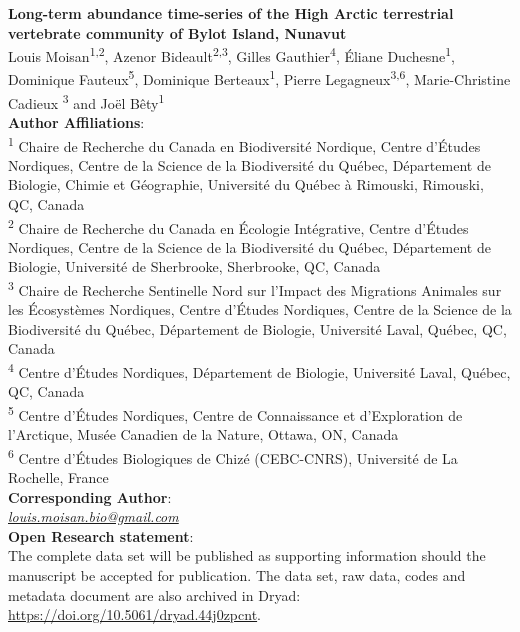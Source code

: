 \documentclass[a4paper,twoside,12pt]{article}
\begin{document}
 
\begingroup  
  \centering
\textbf{Long-term abundance time-series of the High Arctic terrestrial vertebrate community of Bylot Island, Nunavut}\\[1.5em]
 Louis Moisan\textsuperscript{1,2}, Azenor Bideault\textsuperscript{2,3}, Gilles Gauthier\textsuperscript{4}, Éliane Duchesne\textsuperscript{1}, 
 Dominique Fauteux\textsuperscript{5}, Dominique Berteaux\textsuperscript{1}, Pierre Legagneux\textsuperscript{3,6}, Marie-Christine Cadieux \textsuperscript{3} and Joël Bêty\textsuperscript{1}\\[1.5em]
\textbf{Author Affiliations}:\\
\textsuperscript{1} Chaire de Recherche du Canada en Biodiversité Nordique, Centre d’Études Nordiques, Centre de la Science de la Biodiversité du Québec, Département de Biologie, Chimie et Géographie, Université du Québec à Rimouski, Rimouski, QC, Canada\\
\textsuperscript{2} Chaire de Recherche du Canada en Écologie Intégrative, Centre d’Études Nordiques, Centre de la Science de la Biodiversité du Québec, Département de Biologie, Université de Sherbrooke, Sherbrooke, QC, Canada\\
\textsuperscript{3} Chaire de Recherche Sentinelle Nord sur l’Impact des Migrations Animales sur les Écosystèmes Nordiques, Centre d’Études Nordiques, Centre de la Science de la Biodiversité du Québec, Département de Biologie, Université Laval, Québec, QC, Canada\\
\textsuperscript{4} Centre d’Études Nordiques, Département de Biologie, Université Laval, Québec, QC, Canada\\
\textsuperscript{5} Centre d’Études Nordiques, Centre de Connaissance et d’Exploration de l’Arctique, Musée Canadien de la Nature, Ottawa, ON, Canada\\
\textsuperscript{6} Centre d’Études Biologiques de Chizé (CEBC-CNRS), Université de La Rochelle, France 
\\[1.5em]
\textbf{Corresponding Author}:\\
\textit{\href{mailto:louis.moisan.bio@gmail.com}{louis.moisan.bio@gmail.com}}\\
[1.5em]
\textbf{Open Research statement}:\\
The complete data set will be published as supporting information should the manuscript be accepted for publication. The data set, raw data, codes and metadata document are also archived in Dryad: \url{https://doi.org/10.5061/dryad.44j0zpcnt}.\\
\endgroup
\newpage
\end{document}
